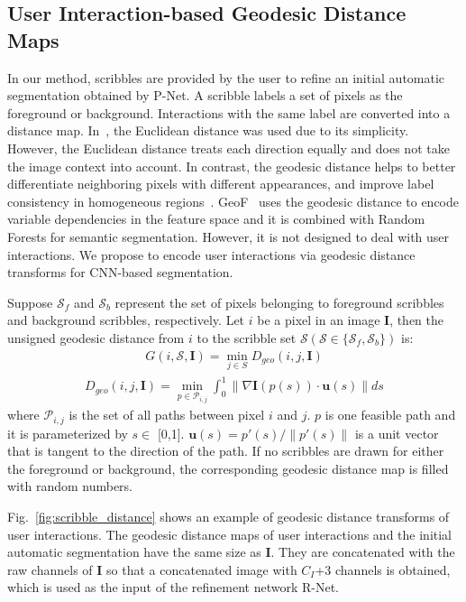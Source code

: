 \documentclass[10pt,journal,compsoc]{IEEEtran}
\begin{document}
\subsection{User Interaction-based Geodesic Distance Maps}\label{method:user_interaction}
In our method, scribbles are provided by the user to refine an initial automatic segmentation obtained by P-Net. A scribble labels a set of pixels as the foreground or background. Interactions with the same label are converted into a distance map. In~\cite{Xu2016}, the Euclidean distance was used due to its simplicity. However, the Euclidean distance treats each direction equally and does not take the image context into account. In contrast, the geodesic distance helps to better differentiate neighboring pixels with different appearances, and improve label consistency in homogeneous regions~\cite{Criminisi2008}. GeoF~\cite{Kohli2013} uses the geodesic distance to encode variable dependencies in the feature space and it is combined with Random Forests for semantic segmentation. However, it is not designed to deal with user interactions. We propose to encode user interactions via geodesic distance transforms for CNN-based segmentation. 

Suppose $\mathcal S_f$ and $\mathcal S_b$ represent the set of pixels belonging to foreground scribbles and background scribbles,  respectively. Let $i$ be a pixel in an image $\mathbf{I}$, then the unsigned geodesic distance from $i$ to the scribble set $\mathcal S (\mathcal S \in \{\mathcal S_f, \mathcal S_b\})$ is:
\begin{align}
G(i,\mathcal S,\mathbf{I}) = \min_{j\in S}{D_{geo}(i,j,\mathbf{I})}
\label{eq:dis}
\end{align}
\begin{align}
D_{geo}(i, j,\mathbf{I})= \min_{p \in \mathcal{P}_{i,j}}
{\int_0^1 \|\nabla \mathbf{I}(p(s)) \cdot \mathbf{u}(s)\| ds}
\label{eq:geodis}
\end{align}
 where $\mathcal{P}_{i,j}$ is the set of all paths between pixel $i$ and $j$. $p$ is one feasible path and it is parameterized by $s\in$ [0,1]. $\mathbf{u}(s) = p'(s)/\|p'(s)\|$ is a unit vector that is tangent to the direction of the path. If no scribbles are drawn for either the foreground or background, the corresponding geodesic distance map is filled with random numbers.

Fig.~\ref{fig:scribble_distance} shows an example of geodesic distance transforms of user interactions. The geodesic distance maps of user interactions and the initial automatic segmentation have the same size as $\mathbf{I}$. They are concatenated with the raw channels of $\mathbf{I}$ so that a concatenated image with $C_I$+3 channels is obtained, which is used as the input of the refinement network R-Net.
\end{document}

